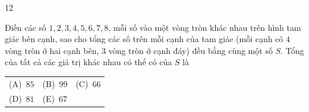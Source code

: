 \documentclass[11pt]{article}
\makeatletter
\newenvironment{probbox}[2]{\begin{probboxT}{#1}{#2}}{\end{probboxT}}
\newcommand{\choicesII}[5]{\par\smallskip\noindent
  \begin{tabularx}{\linewidth}{@{}XXX@{}}(A)\ #1&(B)\ #2&(C)\ #3\\(D)\ #4&(E)\ #5&\end{tabularx}\par}
\makeatother
\begin{document}
\begin{probbox}{12}{\relax}
\begin{minipage}[t]{0.63\linewidth}
Điền các số $1, 2, 3, 4, 5, 6, 7, 8$, mỗi số vào một vòng tròn khác nhau trên hình tam giác bên cạnh, sao cho tổng các số trên mỗi
cạnh của tam giác (mỗi cạnh có $4$ vòng tròn ở hai cạnh bên, $3$ vòng tròn ở cạnh đáy) đều bằng cùng một số $S$. Tổng của tất cả
các giá trị khác nhau có thể có của $S$ là
\choicesII{$85$}{$99$}{$66$}{$81$}{$67$}
\end{minipage}\hfill
\begin{minipage}[t]{0.33\linewidth}\vspace{0pt}\centering
\lgaTriEight{}{}{}{}{}{}{}{}
\end{minipage}
\end{probbox}
\end{document}
